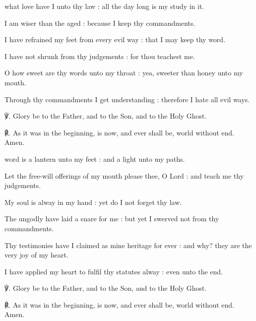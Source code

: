 \begin{multicols}{2}
 what love have I unto thy law : all the day long is my study in it.\par
{}
I am wiser than the aged : because I keep thy commandments.\par
{}I have refrained my feet from every evil way : that I may keep thy word.\par
{}I have not shrunk from thy judgements : for thou teachest me.\par
{}O how sweet are thy words unto my throat : yea, sweeter than honey unto my mouth.\par
{}Through thy commandments I get understanding : therefore I hate all evil ways.\par
℣. Glory be to the Father, and to the Son, and to the Holy Ghost.\par
℟. As it was in the beginning, is now, and ever shall be, world without end. Amen.

 word is a lantern unto my feet : and a light unto my paths.\par
{}
Let the free-will offerings of my mouth please thee, O Lord : and teach me thy judgements.\par
{}My soul is alway in my hand : yet do I not forget thy law.\par
{}The ungodly have laid a snare for me : but yet I swerved not from thy commandments.\par
{}Thy testimonies have I claimed as mine heritage for ever : and why? they are the very joy of my heart.\par
{}I have applied my heart to fulfil thy statutes alway : even unto the end.\par
℣. Glory be to the Father, and to the Son, and to the Holy Ghost.\par
℟. As it was in the beginning, is now, and ever shall be, world without end. Amen.


\end{multicols}
